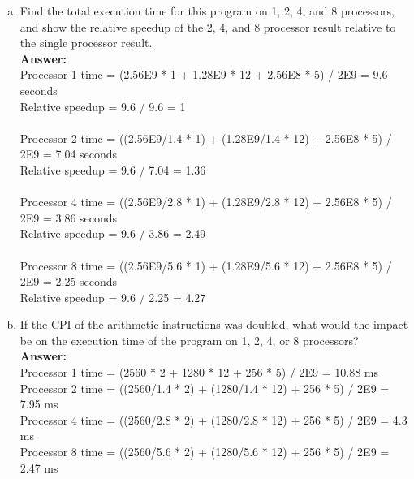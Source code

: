 \documentclass[12pt]{article}
\begin{document}
\begin{enumerate}[(a)]
    \item Find the total execution time for this program on 1, 2, 4, and 8 processors, and show the relative speedup of the 2, 4, and 8 processor result relative to the single processor result.
    \\
    \textbf{Answer:}
    \\
    Processor 1 time = (2.56E9 * 1 + 1.28E9 * 12 + 2.56E8 * 5) / 2E9 = 9.6 seconds\\
    Relative speedup = 9.6 / 9.6 = 1\\
    \\
    Processor 2 time = ((2.56E9/1.4 * 1) + (1.28E9/1.4 * 12) + 2.56E8 * 5) / 2E9 = 7.04 seconds\\
    Relative speedup = 9.6 / 7.04 = 1.36\\
    \\
    Processor 4 time = ((2.56E9/2.8 * 1) + (1.28E9/2.8 * 12) + 2.56E8 * 5) / 2E9 = 3.86 seconds\\
    Relative speedup = 9.6 / 3.86 = 2.49\\
    \\
    Processor 8 time = ((2.56E9/5.6 * 1) + (1.28E9/5.6 * 12) + 2.56E8 * 5) / 2E9 = 2.25 seconds\\
    Relative speedup = 9.6 / 2.25 = 4.27\\

    \item If the CPI of the arithmetic instructions was doubled, what would the impact be on the execution time of the program on 1, 2, 4, or 8 processors?
    \\
    \textbf{Answer:}
    \\
    Processor 1 time = (2560 * 2 + 1280 * 12 + 256 * 5) / 2E9 = 10.88 ms\\
    Processor 2 time = ((2560/1.4 * 2) + (1280/1.4 * 12) + 256 * 5) / 2E9 = 7.95 ms\\
    Processor 4 time = ((2560/2.8 * 2) + (1280/2.8 * 12) + 256 * 5) / 2E9 = 4.3 ms\\
    Processor 8 time = ((2560/5.6 * 2) + (1280/5.6 * 12) + 256 * 5) / 2E9 = 2.47 ms\\
    

\end{enumerate}
\end{document}
